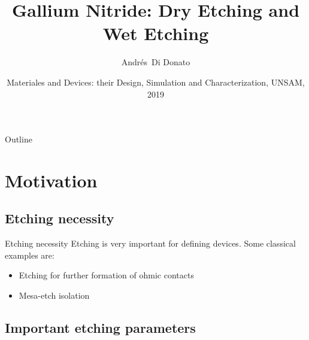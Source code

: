 \documentclass{beamer}
\title[GaN Etching] %
{Gallium Nitride: Dry Etching and Wet Etching}
\author[A. Di Donato] %
{Andrés~Di Donato\inst{1}}
\institute[CNEA] %
{
  \inst{1}%
  Departamento de Micro y Nano Tecnología\\
  Comisión Nacional de Energía Atómica
}
\date[MDDSC 2019] %
{Materiales and Devices: their Design, Simulation and Characterization, UNSAM, 2019}
\begin{document}
\begin{frame}
  \titlepage
\end{frame}

\begin{frame}{Outline}
  \tableofcontents
\end{frame}





\section{Motivation}
\subsection{Etching necessity}

\begin{frame}{Etching necessity}
Etching is very important for defining devices. Some classical examples are:


      \pause
    \begin{itemize}
    \item
      Etching for further formation of ohmic contacts
      \pause
    \item    
      Mesa-etch isolation
    \end{itemize}
\end{frame}


\subsection{Important etching parameters}
  
\end{document}
